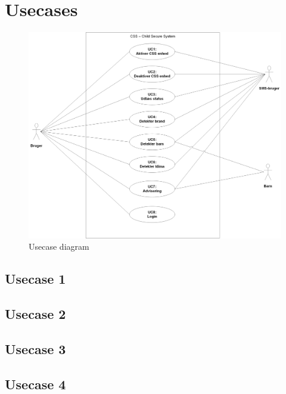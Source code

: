 \clearpage		%

\section{Usecases}

\begin{figure}[htbp] \centering
\vspace*{\fill}
\includegraphics[width=\textwidth]{billeder/Usecase_Diagram}
\caption{Usecase diagram}
\label{lab:usecasediagram}
\vspace*{\fill}
\end{figure}

\subsection{Usecase 1}


\subsection{Usecase 2}


\subsection{Usecase 3}


\subsection{Usecase 4}


